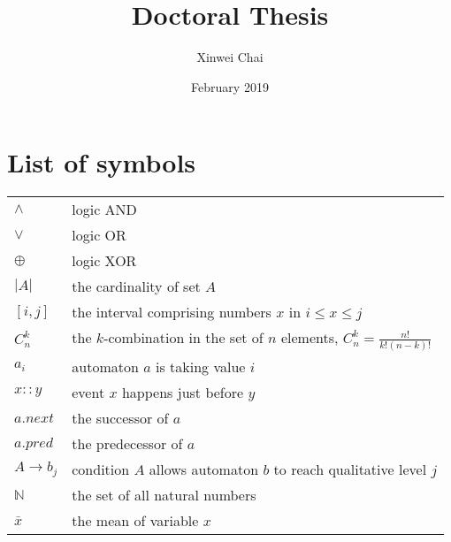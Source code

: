 \documentclass[11pt,twoside,openright]{report}
\title{Doctoral Thesis}
\date{February 2019}
\author{Xinwei Chai}
\theoremstyle{definition}
\begin{document}
\maketitle
\tableofcontents
\listoffigures
\listoftables

\chapter*{List of symbols}
\begin{tabular}{l|l}
    $\land$ & logic AND\\
    $\lor$ & logic OR\\
    $\oplus$ & logic XOR\\
    $|A|$ & the cardinality of set $A$\\
    $[i,j]$&the interval comprising numbers $x$ in $i\leq x\leq j$\\
    $C_n^k$& the $k$-combination in the set of $n$ elements, $C_n^k=\frac {n!}{k!(n-k)!}$\\
    $a_i$  & automaton $a$ is taking value $i$ \\
    $x::y$ & event $x$ happens just before $y$\\
    $a.next$&the successor of $a$\\
    $a.pred$ & the predecessor of $a$\\
    $A\to b_j$ & condition $A$ allows automaton $b$ to reach qualitative level $j$\\
    $\mathbb{N}$ & the set of all natural numbers\\
    $\bar{x}$ & the mean of variable $x$
\end{tabular}






















\appendix

\end{document}
